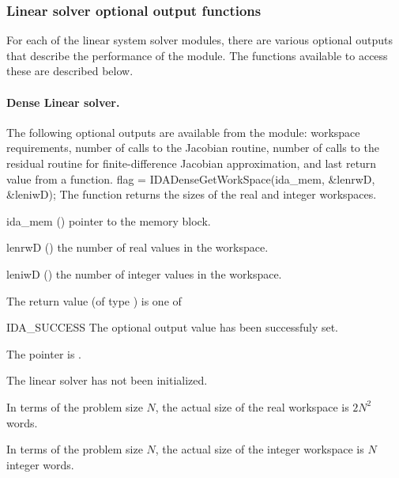 \subsubsection{Linear solver optional output functions}

For each of the linear system solver modules, there are various optional 
outputs that describe the performance of the module. The functions available 
to access these are described below.

\noindent\paragraph{\bf Dense Linear solver.}
The following optional outputs are available from the {\idadense} module:
workspace requirements, number of calls to the Jacobian routine, number of 
calls to the residual routine for finite-difference Jacobian approximation,
and last return value from a {\idadense} function.
{
  flag = IDADenseGetWorkSpace(ida\_mem, \&lenrwD, \&leniwD);
}
{
  The function  returns the sizes of
  the {\idadense} real and integer workspaces.
}
{
  \begin{args}
  \item[ida\_mem] ()
    pointer to the {\ida} memory block.
  \item[lenrwD] ()
    the number of real values in the {\idadense} workspace.
  \item[leniwD] ()
    the number of integer values in the {\idadense} workspace.
  \end{args}
}
{
  The return value  (of type ) is one of
  \begin{args}
  \item[IDA\_SUCCESS] 
    The optional output value has been successfuly set.
  \item[\Id{IDA\_MEM\_NULL}]
    The  pointer is .
  \item[\Id{IDA\_MEM\_NULL}]
    The {\idadense} linear solver has not been initialized.
  \end{args}
}
{
  In terms of the problem size $N$, the actual size of the real workspace
  is $2N^2$  words.

  In terms of the problem size $N$, the actual size of the integer workspace
  is $N$ integer words.
}

